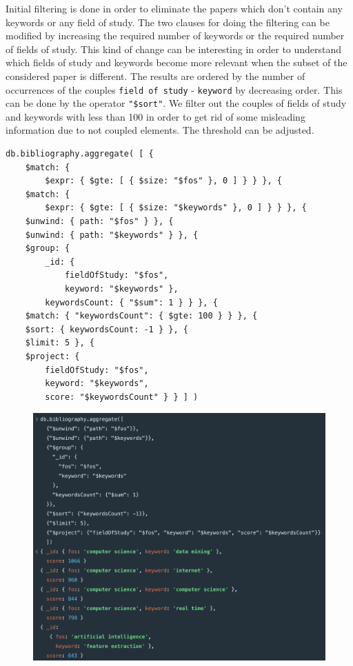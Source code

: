 \begin{enumerate}
    Initial filtering is done in order to eliminate the papers which don't contain any keywords or any field of study.
    The two clauses for doing the filtering can be modified by increasing the required number of keywords or the required number of fields of study.
    This kind of change can be interesting in order to understand which fields of study and keywords become more relevant when the subset of the considered paper is different.
    The results are ordered by the number of occurrences of the couples \verb|field of study| - \verb|keyword| by decreasing order.
    This can be done by the operator \verb|"$sort"|.
    We filter out the couples of fields of study and keywords with less than 100 in order to get rid of some misleading information due to not coupled elements.
    The threshold can be adjusted.
    \begin{lstlisting}[label={lst:query8mongodb}]
db.bibliography.aggregate( [ {
    $match: {
        $expr: { $gte: [ { $size: "$fos" }, 0 ] } } }, {
    $match: {
        $expr: { $gte: [ { $size: "$keywords" }, 0 ] } } }, {
    $unwind: { path: "$fos" } }, {
    $unwind: { path: "$keywords" } }, {
    $group: {
        _id: {
            fieldOfStudy: "$fos",
            keyword: "$keywords" },
        keywordsCount: { "$sum": 1 } } }, {
    $match: { "keywordsCount": { $gte: 100 } } }, {
    $sort: { keywordsCount: -1 } }, {
    $limit: 5 }, {
    $project: {
        fieldOfStudy: "$fos",
        keyword: "$keywords",
        score: "$keywordsCount" } } ] )
    \end{lstlisting}
    \begin{figure}[H]
        \begin{center}
            \includegraphics[width=0.9\linewidth]{ImagesMongoDB/query8mongo}

\end{center}
\end{figure}
\end{enumerate}
